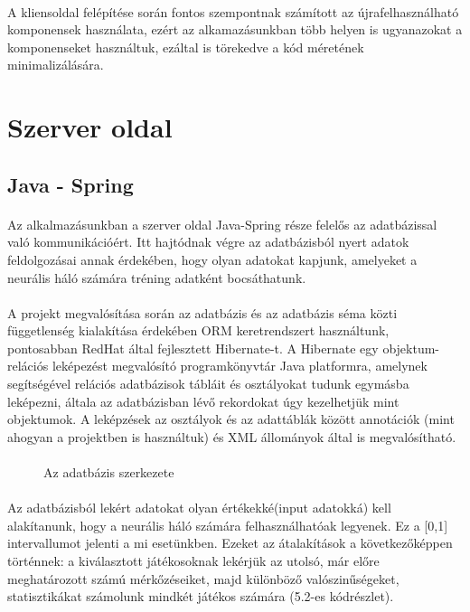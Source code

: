 \paragraph{} A kliensoldal felépítése során fontos szempontnak számított az újrafelhasználható komponensek használata, ezért az alkamazásunkban több helyen is ugyanazokat a komponenseket használtuk, ezáltal is törekedve a kód méretének minimalizálására.

\section{Szerver oldal}
\subsection{Java - Spring}
\paragraph{}
Az alkalmazásunkban a szerver oldal Java-Spring része felelős az adatbázissal való kommunikációért. Itt hajtódnak végre az adatbázisból nyert adatok feldolgozásai annak érdekében, hogy olyan adatokat kapjunk, amelyeket a neurális háló számára tréning adatként bocsáthatunk.

\paragraph{}
A projekt megvalósítása során az adatbázis és az adatbázis séma közti függetlenség kialakítása érdekében ORM keretrendszert használtunk, pontosabban RedHat által fejlesztett Hibernate-t. A Hibernate egy objektum-relációs leképezést megvalósító programkönyvtár Java platformra, amelynek segítségével relációs adatbázisok tábláit és osztályokat tudunk egymásba leképezni, általa az adatbázisban lévő rekordokat úgy kezelhetjük mint objektumok. A leképzések az osztályok és az adattáblák között annotációk (mint ahogyan a projektben is használtuk) és XML állományok által is megvalósítható. 

\paragraph{}
\begin{figure}[t]
  \centering
  \caption[Az adatbázis]%
  { Az adatbázis szerkezete }
  \label{fig:ALAP:sm1}
\end{figure}
\paragraph{}
Az adatbázisból lekért adatokat olyan értékekké(input adatokká) kell alakítanunk, hogy a neurális háló számára felhasználhatóak legyenek. Ez a [0,1] intervallumot jelenti a mi esetünkben. Ezeket az átalakítások a következőképpen történnek: a kiválasztott játékosoknak lekérjük az utolsó, már előre meghatározott számú mérkőzéseiket, majd különböző valószinűségeket, statisztikákat számolunk mindkét játékos számára (5.2-es kódrészlet).

